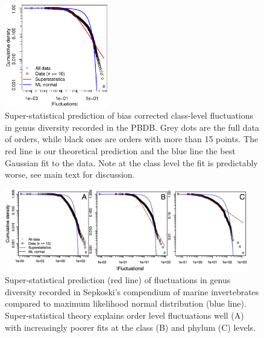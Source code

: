 \documentclass[12pt]{article}
\begin{document}
\begin{figure}[!hp]
  \centering
  \includegraphics[width=0.4\textwidth]{figs/figSupp_Px_cls.pdf}
  \caption[Super-statistical prediction of bias corrected class-level
  data]{Super-statistical prediction of bias corrected class-level
    fluctuations in genus diversity recorded in the PBDB. Grey dots
    are the full data of orders, while black ones are orders with more
    than 15 points. The red line is our theoretical prediction and the
    blue line the best Gaussian fit to the data. Note at the class
    level the fit is predictably worse, see main text for discussion.}
  \label{fig:supp_PBDB_Px_cls}
\end{figure}

\begin{figure}[!hp]
  \centering
  \includegraphics[width=0.95\textwidth]{figs/figSupp_sepk_Px.jpg}
  \caption[Super-statistical prediction for Sepkoski's
  compendium]{Super-statistical prediction (red line) of fluctuations
    in genus diversity recorded in Sepkoski's compendium of marine
    invertebrates compared to maximum likelihood normal distribution
    (blue line). Super-statistical theory explains order level
    fluctuations well (A) with increasingly poorer fits at the class
    (B) and phylum (C) levels.}
  \label{fig:supp_sepkPx}
\end{figure}
\end{document}
